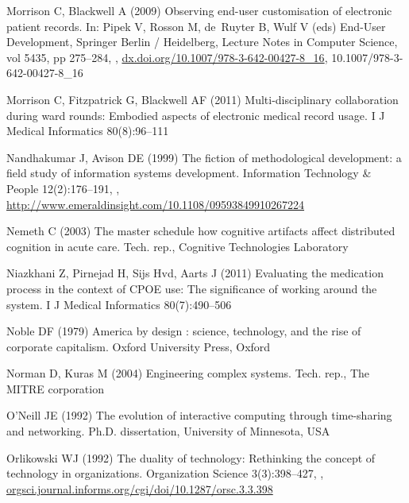 \documentclass{article}
\begin{document}
\begin{thebibliography}{193}
Morrison C, Blackwell A (2009) Observing end-user customisation of electronic
  patient records. In: Pipek V, Rosson M, de~Ruyter B, Wulf V (eds) End-User
  Development, Springer Berlin / Heidelberg, Lecture Notes in Computer Science,
  vol 5435, pp 275--284, ,
  \urlprefix\url{dx.doi.org/10.1007/978-3-642-00427-8_16},
  10.1007/978-3-642-00427-8\_16

Morrison C, Fitzpatrick G, Blackwell AF (2011) Multi-disciplinary collaboration
  during ward rounds: Embodied aspects of electronic medical record usage. I J
  Medical Informatics 80(8):96--111

Nandhakumar J, Avison DE (1999) The fiction of methodological development: a
  field study of information systems development. Information Technology \&
  People 12(2):176--191, ,
  \urlprefix\url{http://www.emeraldinsight.com/10.1108/09593849910267224}

Nemeth C (2003) The master schedule how cognitive artifacts affect distributed
  cognition in acute care. Tech. rep., Cognitive Technologies Laboratory

Niazkhani Z, Pirnejad H, Sijs Hvd, Aarts J (2011) Evaluating the medication
  process in the context of {CPOE} use: The significance of working around the
  system. I J Medical Informatics 80(7):490--506

Noble DF (1979) America by design : science, technology, and the rise of
  corporate capitalism. Oxford University Press, Oxford

Norman D, Kuras M (2004) Engineering complex systems. Tech. rep., The {MITRE}
  corporation

{O'Neill} JE (1992) The evolution of interactive computing through time-sharing
  and networking. {Ph.D.} dissertation, University of Minnesota, {USA}

Orlikowski WJ (1992{}) The duality of technology: Rethinking the
  concept of technology in organizations. Organization Science 3(3):398--427,
  ,
  \urlprefix\url{orgsci.journal.informs.org/cgi/doi/10.1287/orsc.3.3.398}


\end{thebibliography}
\end{document}
